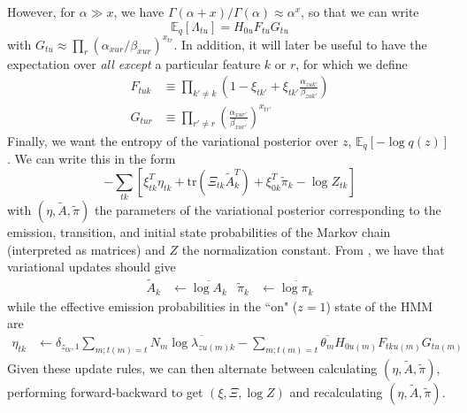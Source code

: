 However, for $\alpha \gg x$, we have $\Gamma(\alpha + x)/\Gamma(\alpha) \approx \alpha^x$, so that we can write
\begin{equation}
    \label{HFG}
    \mathbb{E}_q[\Lambda_{tu}] = H_{0u} F_{tu} G_{tu}
\end{equation}
with $G_{tu} \approx \prod_r (\alpha_{xur}/\beta_{xur})^{x_{tr}}$. In addition, it will later be useful to have the expectation over \emph{all except} a particular feature $k$ or $r$, for which we define
\begin{align}
    \label{F}
    F_{tuk} &\equiv \prod_{k'\neq k} \left(1 - \xi_{tk'} + \xi_{tk'} \frac{\alpha_{zuk'}}{\beta_{zuk'}} \right) \\
    \label{G}
    G_{tur} &\equiv \prod_{r' \neq r} \left(\frac{\alpha_{xur'}}{\beta_{xur'}} \right)^{x_{tr'}}
\end{align}
Finally, we want the entropy of the variational posterior over $z$, $\mathbb{E}_q[-\log q(z)]$. We can write this in the form
\begin{equation}
    -\sum_{tk} \left[
        \xi_{tk}^T\eta_{tk} + \text{tr}\left(\Xi_{tk} \tilde{A}_k^T \right)
        + \xi_{0k}^T\tilde{\pi}_k
        - \log Z_{tk}
    \right]
\end{equation}
with $(\eta, \tilde{A}, \tilde{\pi})$ the parameters of the variational posterior corresponding to the emission, transition, and initial state probabilities of the Markov chain (interpreted as matrices) and $Z$ the normalization constant. From \cite{beal2003variational}, we have that variational updates should give
\begin{align}
    \tilde{A}_k &\leftarrow \overline{\log A_k} &
    \tilde{\pi}_k &\leftarrow \overline{\log \pi_k}
\end{align}
while the effective emission probabilities in the ``on" ($z = 1$) state of the HMM are
\begin{align}
    \eta_{tk} &\leftarrow \delta_{z_{tk}, 1} \sum_{m; t(m) = t} N_m \overline{\log \lambda_{zu(m)k}}
    - \sum_{m; t(m) = t} \overline{\theta_m} H_{0u(m)} F_{tku(m)} G_{tu(m)}
\end{align}
Given these update rules, we can then alternate between calculating $(\eta, \tilde{A}, \tilde{\pi})$, performing forward-backward to get $(\xi, \Xi, \log Z)$ and recalculating $(\eta, \tilde{A}, \tilde{\pi})$.

